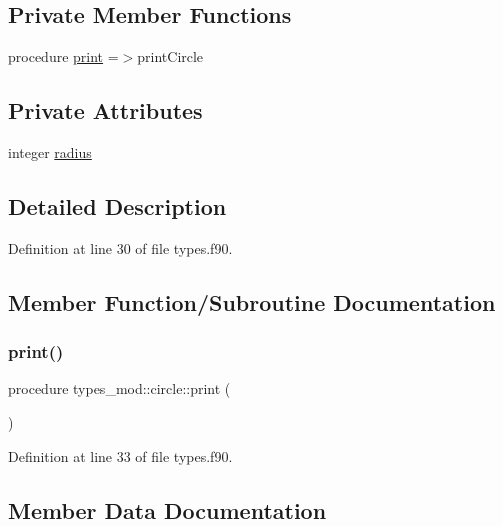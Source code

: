 \subsection*{Private Member Functions}
\begin{DoxyCompactItemize}
\item 
procedure \mbox{\hyperlink{structtypes__mod_1_1circle_a69b68a4eba0ef69a0301786ef11b48fe}{print}} =$>$print\+Circle
\end{DoxyCompactItemize}
\subsection*{Private Attributes}
\begin{DoxyCompactItemize}
\item 
integer \mbox{\hyperlink{structtypes__mod_1_1circle_a89c9659f6cb66700e9f4f6c642242100}{radius}}
\end{DoxyCompactItemize}


\subsection{Detailed Description}


Definition at line 30 of file types.\+f90.



\subsection{Member Function/\+Subroutine Documentation}
\mbox{\label{structtypes__mod_1_1circle_a69b68a4eba0ef69a0301786ef11b48fe}} 
\subsubsection{\texorpdfstring{print()}{print()}}
{\footnotesize\ttfamily procedure types\+\_\+mod\+::circle\+::print (\begin{DoxyParamCaption}{ }\end{DoxyParamCaption})\hspace{0.3cm}{\ttfamily [private]}}



Definition at line 33 of file types.\+f90.



\subsection{Member Data Documentation}
\mbox{\label{structtypes__mod_1_1circle_a89c9659f6cb66700e9f4f6c642242100}} 
